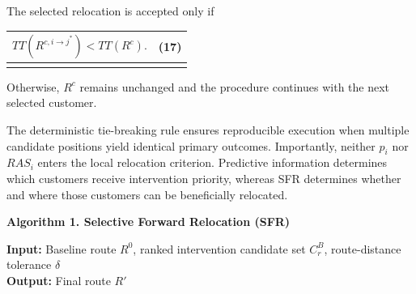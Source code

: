 \documentclass[
]{article}
\newcounter{none} %
\begin{document}
The selected relocation is accepted only if

{\def\LTcaptype{none} %
\begin{longtable}[]{@{}
  >{\raggedright\arraybackslash}p{}
  >{\raggedright\arraybackslash}p{}@{}}
\toprule\noalign{}
\begin{minipage}[b]{\linewidth}\raggedright
\[TT\left( R^{c,i \rightarrow j^{*}} \right) < TT\left( R^{c} \right).\]
\end{minipage} & \begin{minipage}[b]{\linewidth}\raggedleft
(17)
\end{minipage} \\
\midrule\noalign{}
\endhead
\bottomrule\noalign{}
\endlastfoot
\end{longtable}
}

Otherwise, \(R^{c}\) remains unchanged and the procedure continues with
the next selected customer.

The deterministic tie-breaking rule ensures reproducible execution when
multiple candidate positions yield identical primary outcomes.
Importantly, neither \(p_{i}\) nor \(RAS_{i}\) enters the local
relocation criterion. Predictive information determines which customers
receive intervention priority, whereas SFR determines whether and where
those customers can be beneficially relocated.

\textbf{Algorithm 1. Selective Forward Relocation (SFR)}

\textbf{Input:} Baseline route \(R^{0}\), ranked intervention candidate
set \(C_{r}^{B}\), route-distance tolerance \(\delta\)\\
\textbf{Output:} Final route \(R'\)
\end{document}
